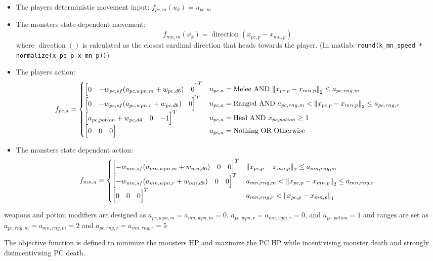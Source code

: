 \documentclass[9pt, onecolumn]{report}
\begin{document}
\begin{itemize}
    \item The players deterministic movement input: $f_{pc,m}(u_k) = u_{pc,m}$
    \item The monsters state-dependent movement:\[
        f_{mn,m}(x_k) = \operatorname{direction}(x_{pc,p} - x_{mn,p})
    \] where $\operatorname{direction}()$ is calculated as the closest cardinal direction that heads towards the player. 
    (In matlab: \verb!round(k_mn_speed * normalize(x_pc_p-x_mn_p))!)
    \item The players action:\[
        f_{pc,a} = \begin{cases}
            \mqty[0 & -w_{pc,sf}(a_{pc,wpn,m} + w_{pc,d6}) & 0]^T & u_{pc,a} = \text{Melee} \text{ AND } \norm{x_{pc,p} - x_{mn,p}}_2 \leq a_{pc,rng,m}\\
            \mqty[0 & -w_{pc,sf}(a_{pc,wpn,r} + w_{pc,d8}) & 0]^T & u_{pc,a} = \text{Ranged} \text{ AND } a_{pc,rng,m} < \norm{x_{pc,p} - x_{mn,p}}_2 \leq a_{pc,rng,r}\\
            \mqty[a_{pc,potion} + w_{pc,d4} & 0 & -1]^T & u_{pc,a} = \text{Heal} \text{ AND } x_{pc,potion} \geq 1\\%
            \mqty[0 & 0 & 0] & u_{pc,a} = \text{Nothing} \text{ OR } \text{Otherwise}
        \end{cases}
    \]
    \item The monsters state dependent action: \[
        f_{mn,a} = \begin{cases}
            \mqty[-w_{mn,sf}(a_{mn,wpn,m} + w_{mn,d6}) & 0 & 0]^T & \norm{x_{pc,p} - x_{mn,p}}_2 \leq a_{mn,rng,m}\\
            \mqty[- w_{mn,sf}(a_{mn,wpn,r} + w_{mn,d8}) & 0 & 0]^T & a_{mn,rng,m} < \norm{x_{pc,p} - x_{mn,p}}_2 \leq  a_{mn,rng,r}\\
            \mqty[0 & 0 & 0]^T &  a_{mn,rng,r} < \norm{x_{pc,p} - x_{mn,p}}_1
        \end{cases}
    \]
\end{itemize}
weapons and potion modifiers are designed as $a_{pc,wpn,m} = a_{mn,wpn,m} = 0$, $a_{pc,wpn,r} = a_{mn,wpn,r} = 0$, and $a_{pc,potion} = 1$
and ranges are set as $a_{pc,rng,m}= a_{mn,rng,m} = 2$ and $ a_{pc,rng,r} =  a_{mn,rng,r} = 5$

The objective function is defined to minimize the monsters HP and maximize the PC HP while incentivising monster death and strongly disincentivising PC death.
\end{document}
